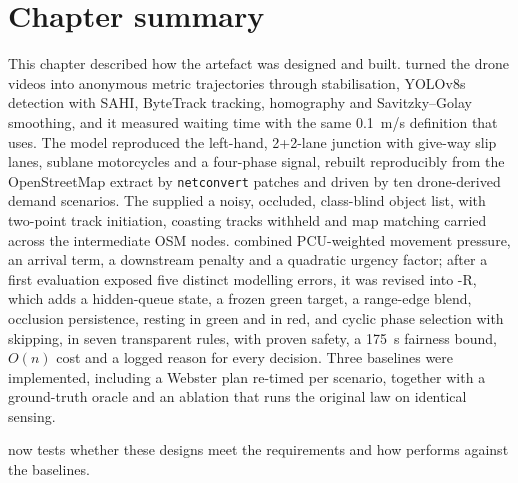 \section{Chapter summary}

This chapter described how the artefact was designed and built. \dtx{} turned the drone videos into
anonymous metric trajectories through stabilisation, YOLOv8s detection with SAHI, ByteTrack tracking,
homography and Savitzky--Golay smoothing, and it measured waiting time with the same 0.1~m/s
definition that \sumo{} uses. The \sumo{} model reproduced the left-hand, 2+2-lane junction with
give-way slip lanes, sublane motorcycles and a four-phase signal, rebuilt reproducibly from the OpenStreetMap
extract by \texttt{netconvert} patches and driven by ten drone-derived demand scenarios. The \vls{} supplied a
noisy, occluded, class-blind object list, with two-point track initiation, coasting tracks withheld and map
matching carried across the intermediate OSM nodes. \prism{} combined PCU-weighted movement pressure, an
arrival term, a downstream penalty and a quadratic urgency factor; after a first evaluation exposed five
distinct modelling errors, it was revised into \prism{}-R, which adds a hidden-queue state, a frozen
green target, a range-edge blend, occlusion persistence, resting in green and in red, and cyclic phase
selection with skipping, in seven transparent rules, with proven safety, a 175~s fairness bound,
$O(n)$ cost and a logged reason for every decision. Three baselines were implemented, including a
Webster plan re-timed per scenario, together with a ground-truth oracle and an ablation that runs the
original law on identical sensing.

 now tests whether these designs meet the requirements and how \prism{} performs
against the baselines.
